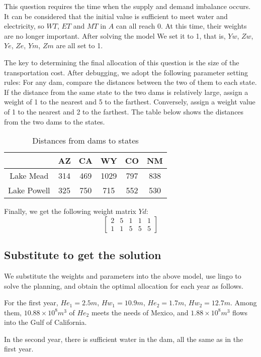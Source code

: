 \documentclass{mcmthesis}
\begin{document}
This question requires the time when the supply and demand imbalance occurs. It can be considered that the initial value is sufficient to meet water and electricity, so $WT$, $ET$ and $MT$ in $A$ can all reach 0. At this time, their weights are no longer important. After solving the model We set it to 1, that is, $Yw$, $Zw$, $Ye$, $Ze$, $Ym$, $Zm$ are all set to 1.

The key to determining the final allocation of this question is the size of the transportation cost. After debugging, we adopt the following parameter setting rules: For any dam, compare the distances between the two of them to each state. If the distance from the same state to the two dams is relatively large, assign a weight of 1 to the nearest and 5 to the farthest. Conversely, assign a weight value of 1 to the nearest and 2 to the farthest. The table below shows the distances from the two dams to the states.

\begin{table}[h]
	\centering
	\caption{Distances from dams to states}
	\begin{tabular}{cccccc}
		\hline
		& AZ  & CA  & WY   & CO  & NM  \\
		\hline
		Lake Mead   & 314 & 469 & 1029 & 797 & 838 \\
		Lake Powell & 325 & 750 & 715  & 552 & 530\\
		\hline
	\end{tabular}
\end{table}

Finally, we get the following weight matrix $Yd$:
\begin{equation}
	\begin{bmatrix}
		2&5&1&1&1\\
		1&1&5&5&5
	\end{bmatrix}
\end{equation}
\subsection{Substitute to get the solution}

We substitute the weights and parameters into the above model, use lingo to solve the planning, and obtain the optimal allocation for each year as follows.

For the first year, $He_1=2.5m$, $Hw_1=10.9m$, $He_2=1.7m$, $Hw_2=12.7m$. Among them, $10.88\times 10^8m^3$ of $He_2$ meets the needs of Mexico, and $1.88\times 10^8m^3$ flows into the Gulf of California.

In the second year, there is sufficient water in the dam, all the same as in the first year.
\end{document}

